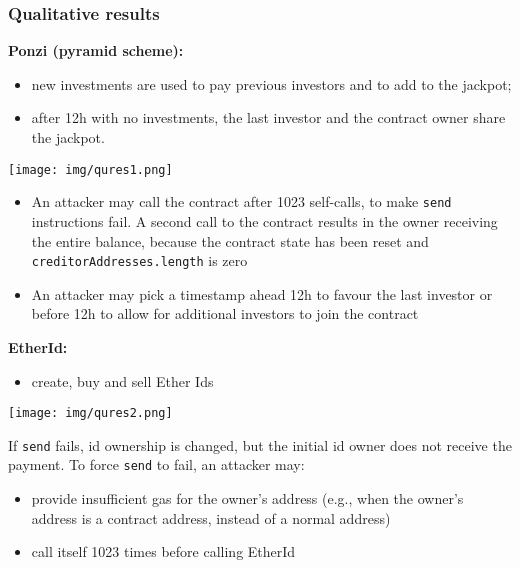 \documentclass[a4paper, 10pt, titlepage]{article}
\begin{document}
\subsubsection*{Qualitative results}
\textbf{Ponzi (pyramid scheme):}
\begin{itemize}
\item new investments are used to pay previous investors and to
add to the jackpot;
\item after 12h with no investments, the last investor and the
contract owner share the jackpot.
\end{itemize}
\begin{center}
\texttt{[image: img/qures1.png]}
\end{center}
\begin{itemize}
\item An attacker may call the contract after 1023 self-calls, to make \lstinline|send| instructions fail. A second call to the contract results in the owner receiving the entire balance, because the contract state has been reset and \lstinline|creditorAddresses.length| is zero
\item An attacker may pick a timestamp ahead 12h to favour the last investor or before 12h to allow for additional investors to join the contract
\end{itemize}
\textbf{EtherId:}
\begin{itemize}
\item create, buy and sell Ether Ids
\end{itemize}
\begin{center}
\texttt{[image: img/qures2.png]}
\end{center}
If \lstinline|send| fails, id ownership is changed, but the initial id owner does not receive the payment. To force \lstinline|send| to fail, an attacker may:
\begin{itemize}
\item provide insufficient gas for the owner’s address (e.g., when the owner’s address is a contract address, instead of a normal address)
\item call itself 1023 times before calling EtherId
\end{itemize}
\end{document}

